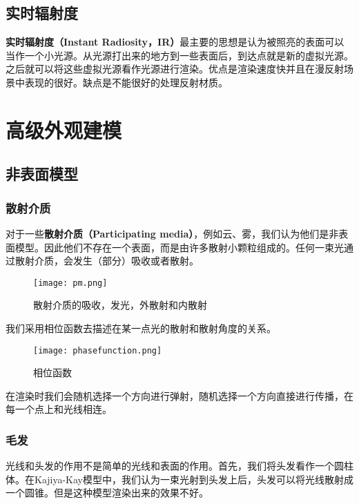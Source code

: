 \documentclass[openany]{progbookcn}
\begin{document}
\subsection{实时辐射度}

\textbf{实时辐射度（Instant Radiosity，IR）}最主要的思想是认为被照亮的表面可以当作一个小光源。从光源打出来的地方到一些表面后，到达点就是新的虚拟光源。之后就可以将这些虚拟光源看作光源进行渲染。优点是渲染速度快并且在漫反射场景中表现的很好。缺点是不能很好的处理反射材质。

\section{高级外观建模}

\subsection{非表面模型}

\subsubsection{散射介质}

对于一些\textbf{散射介质（Participating media）}，例如云、雾，我们认为他们是非表面模型。因此他们不存在一个表面，而是由许多散射小颗粒组成的。任何一束光通过散射介质，会发生（部分）吸收或者散射。

\begin{figure}[H]
	\centering
	\texttt{[image: pm.png]}
	\caption{散射介质的吸收，发光，外散射和内散射}
	\label{fig:pm}
\end{figure}

我们采用相位函数去描述在某一点光的散射和散射角度的关系。

\begin{figure}[H]
	\centering
	\texttt{[image: phasefunction.png]}
	\caption{相位函数}
	\label{fig:pf}
\end{figure}

在渲染时我们会随机选择一个方向进行弹射，随机选择一个方向直接进行传播，在每一个点上和光线相连。

\subsubsection{毛发}

光线和头发的作用不是简单的光线和表面的作用。首先，我们将头发看作一个圆柱体。在Kajiya-Kay模型中，我们认为一束光射到头发上后，头发可以将光线散射成一个圆锥。但是这种模型渲染出来的效果不好。
\end{document}
